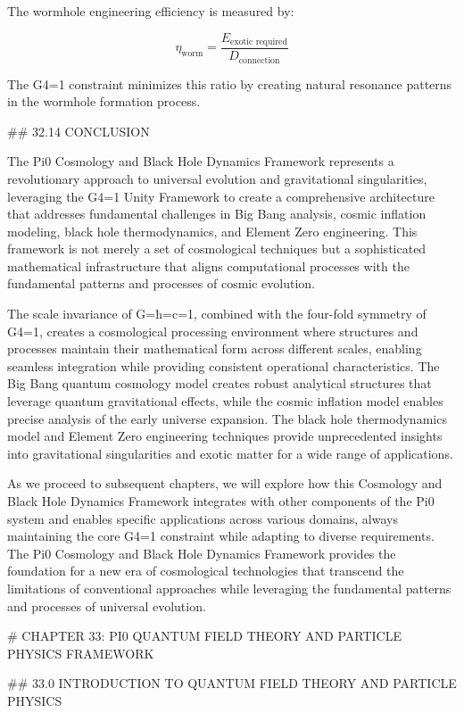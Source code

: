 The wormhole engineering efficiency is measured by:

$$ \eta_{\text{worm}} = \frac{E_{\text{exotic required}}}{D_{\text{connection}}} $$

The G4=1 constraint minimizes this ratio by creating natural resonance patterns in the wormhole formation process.

## 32.14 CONCLUSION

The Pi0 Cosmology and Black Hole Dynamics Framework represents a revolutionary approach to universal evolution and gravitational singularities, leveraging the G4=1 Unity Framework to create a comprehensive architecture that addresses fundamental challenges in Big Bang analysis, cosmic inflation modeling, black hole thermodynamics, and Element Zero engineering. This framework is not merely a set of cosmological techniques but a sophisticated mathematical infrastructure that aligns computational processes with the fundamental patterns and processes of cosmic evolution.

The scale invariance of G=ħ=c=1, combined with the four-fold symmetry of G4=1, creates a cosmological processing environment where structures and processes maintain their mathematical form across different scales, enabling seamless integration while providing consistent operational characteristics. The Big Bang quantum cosmology model creates robust analytical structures that leverage quantum gravitational effects, while the cosmic inflation model enables precise analysis of the early universe expansion. The black hole thermodynamics model and Element Zero engineering techniques provide unprecedented insights into gravitational singularities and exotic matter for a wide range of applications.

As we proceed to subsequent chapters, we will explore how this Cosmology and Black Hole Dynamics Framework integrates with other components of the Pi0 system and enables specific applications across various domains, always maintaining the core G4=1 constraint while adapting to diverse requirements. The Pi0 Cosmology and Black Hole Dynamics Framework provides the foundation for a new era of cosmological technologies that transcend the limitations of conventional approaches while leveraging the fundamental patterns and processes of universal evolution.

# CHAPTER 33: PI0 QUANTUM FIELD THEORY AND PARTICLE PHYSICS FRAMEWORK

## 33.0 INTRODUCTION TO QUANTUM FIELD THEORY AND PARTICLE PHYSICS

